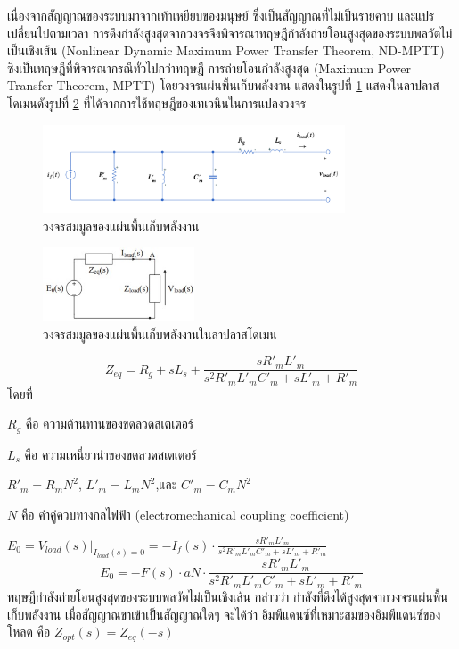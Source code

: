 \documentclass[11pt,a4paper]{article}
\begin{document}
เนื่องจากสัญญาณของระบบมาจากเท้าเหยียบของมนุษย์ ซึ่งเป็นสัญญาณที่ไม่เป็นรายคาบ และแปรเปลี่ยนไปตามเวลา การดึงกำลังสูงสุดจากวงจรจึงพิจารณาทฤษฎีกำลังถ่ายโอนสูงสุดของระบบพลวัตไม่เป็นเชิงเส้น (Nonlinear Dynamic Maximum Power Transfer Theorem, ND-MPTT) ซึ่งเป็นทฤษฎีที่พิจารณากรณีทั่วไปกว่าทฤษฎี การถ่ายโอนกำลังสูงสุด (Maximum Power Transfer Theorem, MPTT)  
โดยวงจรแผ่นพื้นเก็บพลังงาน แสดงในรูปที่ \ref{harvest_circuit} แสดงในลาปลาสโดเมนดังรูปที่ \ref{laplce_genpath_circuit} ที่ได้จากการใช้ทฤษฎีของเทเวนินในการแปลงวงจร 
\begin{figure}[H]
    \begin{center}
        \includegraphics[width=0.8\textwidth]{harvest_circuit.png}
    \end{center}
    \caption{วงจรสมมูลของแผ่นพื้นเก็บพลังงาน}
    \label{harvest_circuit}
\end{figure}
\begin{figure}[H]
    \begin{center}
        \includegraphics[width=0.4\textwidth]{laplce_genpath_circuit.jpg}
    \end{center}
    \caption{วงจรสมมูลของแผ่นพื้นเก็บพลังงานในลาปลาสโดเมน}
    \label{laplce_genpath_circuit}
\end{figure}
\begin{equation}\label{zeq}
    Z_{eq}  = R_{g} + sL_{s} + \frac{ sR'_{m}L'_{m} }{ s^2R'_{m}L'_{m}C'_{m} + sL'_{m} + R'_{m} }
\end{equation}
โดยที่

$R_{g}$ คือ ความต้านทานของขดลวดสเตเตอร์

$L_{s}$ คือ ความเหนี่ยวนำของขดลวดสเตเตอร์

$R'_{m} = R_{m}N^2$, $L'_{m} = L_{m}N^2$,และ $C'_{m} = C_{m}N^2$

$N$ คือ ค่าคู่ควบทางกลไฟฟ้า (electromechanical coupling coefficient)

$E_{0} = V_{load}(s)\vert_{I_{load}(s) = 0} = -I_{f}(s) \cdot \frac{ sR'_{m}L'_{m} }{ s^2R'_{m}L'_{m}C'_{m} + sL'_{m} + R'_{m}}$
\begin{equation}\label{E0}
    E_{0} = -F(s) \cdot aN \cdot \frac{ sR'_{m}L'_{m} }{ s^2R'_{m}L'_{m}C'_{m} + sL'_{m} + R'_{m}}
\end{equation}
ทฤษฎีกำลังถ่ายโอนสูงสุดของระบบพลวัตไม่เป็นเชิงเส้น กล่าวว่า กำลังที่ดึงได้สูงสุดจากวงจรแผ่นพื้นเก็บพลังงาน เมื่อสัญญาณขาเข้าเป็นสัญญาณใดๆ จะได้ว่า อิมพีแดนซ์ที่เหมาะสมของอิมพีแดนซ์ของโหลด คือ
$Z_{opt}(s)= Z_{eq}(-s)$
\end{document}
